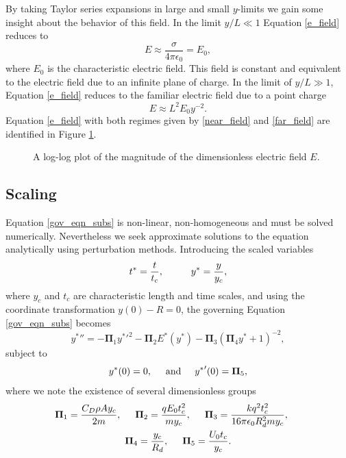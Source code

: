 \documentclass[aip,reprint, floatfix]{revtex4-1}
\begin{document}
By taking Taylor series expansions in large and small $y$-limits we gain some insight about the behavior of this field. In the limit $y/L \ll 1$ Equation \ref{e_field} reduces to
\begin{equation}
\label{near_field}
E \approx \frac{\sigma}{4 \pi \epsilon_0} = E_0,
\end{equation}
where $E_0$ is the characteristic electric field. This field is constant and equivalent to the electric field due to an infinite plane of charge. In the limit of $y/L \gg 1$, Equation \ref{e_field} reduces to the familiar electric field due to a point charge
\begin{equation}
\label{far_field}
E \approx L^2 E_0 y^{-2}.
\end{equation}
Equation \ref{e_field} with both regimes given by \ref{near_field} and \ref{far_field} are identified in Figure \ref{fig:E0}.
\begin{figure}[h]
    \centering
    \def\svgwidth{\columnwidth}
    
    \caption{A log-log plot of the magnitude of the dimensionless electric field $E$.\label{fig:E0}}
\end{figure}

\subsection{Scaling}
Equation \ref{gov_eqn_subs} is non-linear, non-homogeneous and must be solved numerically. Nevertheless we seek approximate solutions to the equation analytically using perturbation methods. Introducing the scaled variables
\begin{equation}
 t^* = \frac{t}{t_c}, \hspace{10 mm} y^* = \frac{y}{y_c}, \end{equation}
where $y_c$ and $t_c$ are characteristic length and time scales, and using the coordinate transformation $y(0) - R = 0$, the governing Equation \ref{gov_eqn_subs} becomes
\begin{equation}
\label{pi_terms}
 {y^*}'' = - \mathbf{\Pi}_1 {y^*}'^2
- \mathbf{\Pi}_2 E^* ( {y^*} ) 
- \mathbf{\Pi}_3 \left( \mathbf{\Pi}_4 {y^*} + 1 \right)^{-2},
\end{equation}
subject to
\begin{equation*}
{y^*}(0) = 0, \hspace{5 mm} \mbox{and} \hspace{5 mm} {y^*}'(0) = \mathbf{\Pi}_5,
\end{equation*}
where we note the existence of several dimensionless groups
\begin{gather*}
\mathbf{\Pi}_1 = \frac{C_D \rho A y_c}{2 m}, \hspace{5 mm}
\mathbf{\Pi}_2 = \frac{q E_0 t_c^2}{m y_c}, \hspace{5 mm}
\mathbf{\Pi}_3 = \frac{k q^2 t_c^2}{16 \pi \epsilon_0 R_d^2 m y_c}, \hspace{5 mm}\\
\mathbf{\Pi}_4 = \frac{y_c}{R_d}, \hspace{5 mm}
\mathbf{\Pi}_5 = \frac{U_0 t_c}{y_c}.
\end{gather*}
\end{document}
